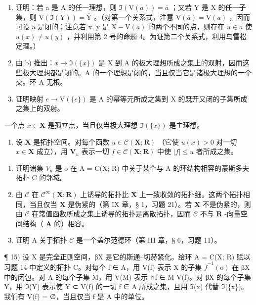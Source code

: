\begin{enumerate}
\def\labelenumi{\alph{enumi})}
\setcounter{enumi}{1}
\item
  证明：若 a 是 A 的任一理想，则 \(\Im(\mathrm{V}(a)) = \overline{a}\) ；又若 Y 是 X 的任一子集，则 \(\mathrm{V}(\Im(\mathrm{Y})) = \overline{\mathrm{Y}}\) 。（对第一个关系式，注意 \(\mathrm{V}(\overline{a}) = \mathrm{V}(a)\) ，因而可设 a 是闭的；注意若 x, y 是 \(\mathrm{X} - \mathrm{V}(a)\) 的两个不同的点，则存在 \(u \in a\) 使 \(u(x) \neq u(y)\) ，并利用第 2 号的命题 4。为证第二个关系式，利用乌雷松定理。）
\item
  由 b) 推出：\(x \to \Im(\{x\})\) 是 X 到 A 的极大理想所成之集上的双射，因而这些极大理想都是闭的。A 的一个理想是闭的，当且仅当它是诸极大理想的一个交。环 A 无根。
\item
  证明映射 \(e \to \mathrm{V}(\{e\})\) 是 A 的幂等元所成之集到 X 的既开又闭的子集所成之集上的双射。
\end{enumerate}

一个点 \(x \in \mathbf{X}\) 是孤立点，当且仅当极大理想 \(\Im(\{x\})\) 是主理想。

\begin{enumerate}
\def\labelenumi{\arabic{enumi})}
\setcounter{enumi}{13}
\tightlist
\item
  设 \(\mathbf{X}\) 是拓扑空间。对每个函数 \(u \in \mathcal{C}(\mathbf{X}; \mathbf{R})\) （它使 \(u(x) > 0\) 对一切 \(x \in \mathbf{X}\) 成立），用 \(\mathbf{V}_u\) 表示一切 \(f \in \mathcal{C}(\mathbf{X}; \mathbf{R})\) 中使 \(|f| \leqslant u\) 者所成之集。
\end{enumerate}

\begin{enumerate}
\def\labelenumi{\alph{enumi})}
\item
  证明诸集 \(V_{u}\) 是 o 在 A = C(X; R) 中关于某个与 A 的环结构相容的豪斯多夫拓扑 C 的邻域。
\item
  由 \(\mathcal{C}\) 在 \(\mathcal{C}^{\infty}(\mathbf{X};\mathbf{R})\) 上诱导的拓扑比 \(\mathbf{X}\) 上一致收敛的拓扑细。这两个拓扑相同，当且仅当 \(\mathbf{X}\) 是伪紧的（第 IX 章，§ 1，习题 21）。若 \(\mathbf{X}\) 不是伪紧的，则由 \(\mathcal{C}\) 在常值函数所成之集上诱导的拓扑是离散拓扑，因而 \(\mathcal{C}\) 不与 \(\mathbf{R}\) -向量空间结构（ \(\mathbf{A}\) 的）相容。
\item
  证明 A 关于拓扑 \(\mathcal{C}\) 是一个盖尔范德环（第 III 章，§ 6，习题 11）。
\end{enumerate}

¶ 15) 设 X 是完全正则空间，βX 是它的斯通–切赫紧化。给环 A = C(X; R) 赋以习题 14 中定义的拓扑 C。对每个 f ∈ A，用 V(f) 表示 X 的子集 \(\overline{f}^{-1}(\mathrm{o})\) 在 βX 中的闭包。对 A 的每个子集 M，用 V(M) 表示 ∩f ∈ M V(f)。对 βX 的每个子集 Y，用 ℑ(Y) 表示使 Y ⊂ V(f) 的一切 f ∈ A 所成之集，且用 ℑ(x) 代替 ℑ(\{x\})。我们有 V(f) = ∅，当且仅当 f 是 A 中的单位。

